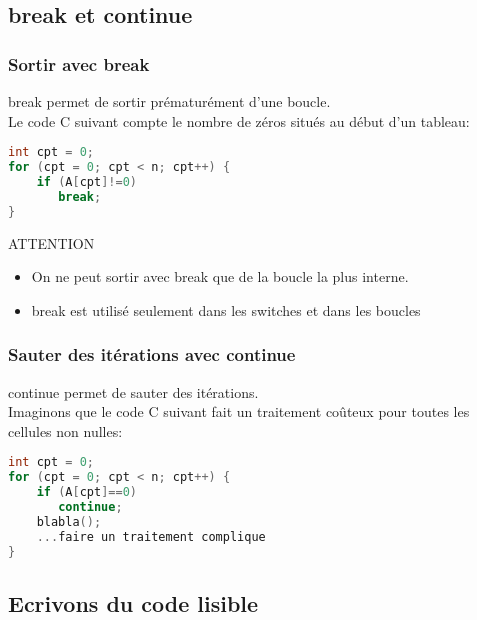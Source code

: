 \documentclass{beamer}
\begin{document}
\subsection{break et continue}

\begin{frame}[fragile=singleslide,shrink=20]
\frametitle {Sortir avec break}
break permet de sortir prématurément d'une boucle. \\
Le code C suivant compte le nombre de zéros situés au début d'un tableau:
\begin{lstlisting}[language=c++]
int cpt = 0;
for (cpt = 0; cpt < n; cpt++) {
    if (A[cpt]!=0)
       break;
}
\end{lstlisting}

\begin{block}{ATTENTION}
\begin{itemize}
\item{On ne peut sortir avec break que de la boucle la plus interne.}
\item{break est utilisé seulement dans les switches et dans les boucles}
\end{itemize}
\end{block}
\end{frame}

\begin{frame}[fragile=singleslide,shrink=20]
\frametitle {Sauter des itérations avec continue}
continue permet de sauter des itérations. \\
Imaginons que le code C suivant fait un traitement coûteux pour toutes les cellules non nulles:
\begin{lstlisting}[language=c++]
int cpt = 0;
for (cpt = 0; cpt < n; cpt++) {
    if (A[cpt]==0)
       continue;
    blabla();
    ...faire un traitement complique
}
\end{lstlisting}
\end{frame}

\subsection{Ecrivons du code lisible}
\end{document}
